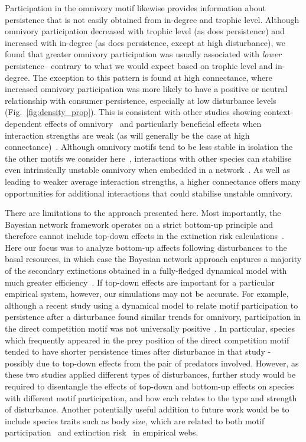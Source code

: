 \documentclass[12pt]{article}
\begin{document}
\begin{spacing}{2.0}
    Participation in the omnivory motif likewise provides information about persistence that is not easily obtained from in-degree and trophic level.
    Although omnivory participation decreased with trophic level (as does persistence) and increased with in-degree (as does persistence, except at high disturbance), we found that greater omnivory participation was usually associated with \emph{lower} persistence-- contrary to what we would expect based on trophic level and in-degree.
    The exception to this pattern is found at high connectance, where increased omnivory participation was more likely to have a positive or neutral relationship with consumer persistence, especially at low disturbance levels (Fig.~\ref{fig:density_prop}).
    This is consistent with other studies showing context-dependent effects of omnivory~\citep{bascompte2005simple, Monteiro2016} and particularly beneficial effects when interaction strengths are weak (as will generally be the case at high connectance)~\citep{Emmerson2004}.
    Although omnivory motifs tend to be less stable in isolation the the other motifs we consider here~\citep{Borrelli2015a}, interactions with other species can stabilise even intrinsically unstable omnivory when embedded in a network~\citep{Kratina2012}.
    As well as leading to weaker average interaction strengths, a higher connectance offers many opportunities for additional interactions that could stabilise unstable omnivory.
    

    There are limitations to the approach presented here.
    Most importantly, the Bayesian network framework operates on a strict bottom-up principle and therefore cannot include top-down effects in the extinction risk calculations~\citep{Eklof2013}. 
    Here our focus was to analyze bottom-up affects following disturbances to the basal resources, in which case the Bayesian network approach captures a majority of the secondary extinctions obtained in a fully-fledged dynamical model with much greater efficiency~\citep{Eklof2013}.
    If top-down effects are important for a particular empirical system, however, our simulations may not be accurate. 
    For example, although a recent study using a dynamical model to relate motif participation to persistence after a disturbance found similar trends for omnivory, participation in the direct competition motif was not universally positive~\citep{Cirtwill2022Oikos}.
    In particular, species which frequently appeared in the prey position of the direct competition motif tended to have shorter persistence times after disturbance in that study - possibly due to top-down effects from the pair of predators involved.
    However, as these two studies applied different types of disturbances, further study would be required to disentangle the effects of top-down and bottom-up effects on species with different motif participation, and how each relates to the type and strength of disturbance.
    Another potentially useful addition to future work would be to include species traits such as body size, which are related to both motif participation~\citep{cirtwill2018feeding} and extinction risk~\citep{Brose2017,Cardillo2005,Purvis2000} in empirical webs.
    

\end{spacing}
\end{document}
